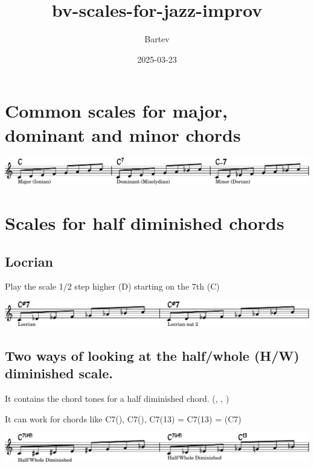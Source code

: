 \documentclass[11pt]{article}
\author{Bartev}
\date{2025-03-23}
\title{bv-scales-for-jazz-improv}
\let\maketitle\relax %
\begin{document}
\maketitle

\section{Common scales for major, dominant and minor chords}
\label{sec:org94af96e}

\begin{center}
\includegraphics[width=.98\linewidth]{maj-myx-dor.pdf}
\end{center}

\section{Scales for half diminished chords}
\label{sec:org5fd82fd}
\subsection{Locrian}
\label{sec:org40261c9}
Play the scale 1/2 step higher (D\flat) starting on the 7th (C)
\begin{center}
\includegraphics[width=.98\linewidth]{half-dim-chords.pdf}
\end{center}

\subsection{Two ways of looking at the half/whole (H/W) diminished scale.}
\label{sec:org3fd8170}

It contains the chord tones for a half diminished chord. (, , )

It can work for chords like C7(), C7(), C7(13) = C7(13) = (C7)

\begin{center}
\includegraphics[width=.98\linewidth]{half-whole-dim.pdf}
\end{center}
\end{document}
